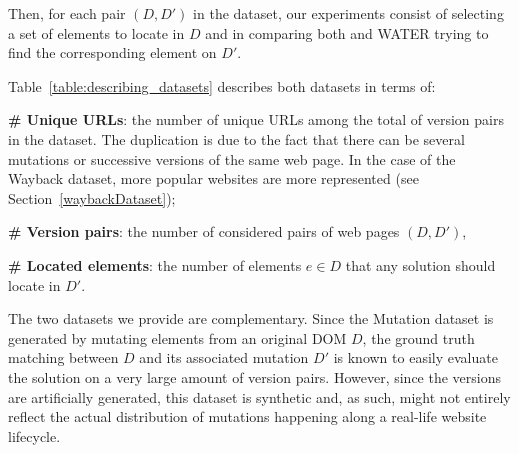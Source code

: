 \documentclass[preprint, 12pt]{elsarticle}
\begin{document}
Then, for each pair $(D, D')$ in the dataset, our experiments consist of selecting a set of elements to locate in $D$ and in comparing both \erratum{} and WATER trying to find the corresponding element on $D'$.

Table~\ref{table:describing_datasets} describes both datasets in terms of:
\begin{compactenum}
    \item \textbf{\# Unique URLs}: the number of unique URLs among the total of version pairs in the dataset. The duplication is due to the fact that there can be several mutations or successive versions of the same web page. In the case of the {\sc Wayback} dataset, more popular websites are more represented (see Section~\ref{waybackDataset});
    \item \textbf{\# Version pairs}: the number of considered pairs of web pages $(D, D')$,
    \item \textbf{\# Located elements}: the number of elements $e \in D$ that any solution should locate in $D'$.
\end{compactenum}

\begin{table}[!htbp]
    \caption{Description of the \textsc{Mutation} \& \textsc{Wayback} datasets.}
    \label{table:describing_datasets}
    \centering
\end{table}

The two datasets we provide are complementary. 
Since the {\sc Mutation} dataset is generated by mutating elements from an original DOM $D$, the ground truth matching between $D$ and its associated mutation $D'$ is known to easily evaluate the solution on a very large amount of version pairs. 
However, since the versions are artificially generated, this dataset is synthetic and, as such, might not entirely reflect the actual distribution of mutations happening along a real-life website lifecycle.
\end{document}
